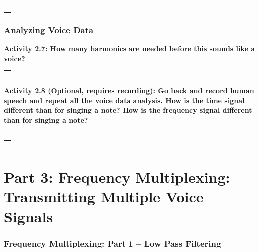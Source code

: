 \documentclass[11pt]{article}
\begin{document}
\begin{longtable}[]{@{}l@{}}
\toprule
 \\
\midrule
\endhead
 \\
 \\
 \\
\bottomrule
\end{longtable}

\hypertarget{analyzing-voice-data}{%
\subsubsection*{Analyzing Voice Data}\label{analyzing-voice-data}}

\textbf{Activity 2.7: How many harmonics are needed before this sounds
like a voice?}

\begin{longtable}[]{@{}l@{}}
\toprule
 \\
\midrule
\endhead
 \\
 \\
 \\
\bottomrule
\end{longtable}

\textbf{Activity 2.8 (Optional, requires recording): Go back and record
human speech and repeat all the voice data analysis. How is the time
signal different than for singing a note? How is the frequency signal
different than for singing a note?}

\begin{longtable}[]{@{}l@{}}
\toprule
 \\
\midrule
\endhead
 \\
 \\
 \\
\bottomrule
\end{longtable}

    \begin{center}\rule{\linewidth}{0.5pt}\end{center}

\hypertarget{part-3-frequency-multiplexing-transmitting-multiple-voice-signals}{%
\section*{Part 3: Frequency Multiplexing: Transmitting Multiple Voice
Signals}\label{part-3-frequency-multiplexing-transmitting-multiple-voice-signals}}

\hypertarget{frequency-multiplexing-part-1-low-pass-filtering}{%
\subsubsection*{Frequency Multiplexing: Part 1 -- Low Pass
Filtering}\label{frequency-multiplexing-part-1-low-pass-filtering}}
\end{document}

